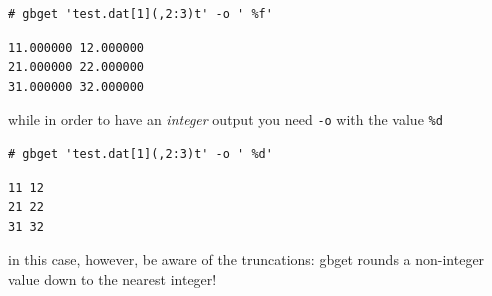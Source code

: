 \documentclass[11pt]{article}
\begin{document}
\begin{verbatim}
# gbget 'test.dat[1](,2:3)t' -o ' %f'
\end{verbatim}

\begin{verbatim}
11.000000 12.000000
21.000000 22.000000
31.000000 32.000000
\end{verbatim}

while in order to have an \emph{integer} output you need \verb~-o~ with the
value \verb~%d~

\begin{verbatim}
# gbget 'test.dat[1](,2:3)t' -o ' %d'
\end{verbatim}

\begin{verbatim}
11 12
21 22
31 32
\end{verbatim}

in this case, however, be aware of the truncations: gbget rounds a
non-integer value down to the nearest integer!
\end{document}
